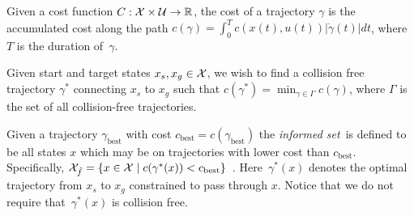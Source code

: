 \documentclass[letterpaper, 10 pt, conference]{ieeeconf}  %
\begin{document}
Given a cost function $C : \mathcal{X} \times \mathcal{U} \rightarrow \mathbb{R}$, the cost of a trajectory $ \gamma $ is the accumulated cost along the path
$c(\gamma) = \int_0^{T} c( x(t), u(t) ) |\dot{\gamma}(t)|dt$, 
where $T$ is the duration of~$\gamma$.

Given start and target states $x_s, x_g \in \mathcal{X}$, we wish to find a collision free trajectory $\gamma^*$ connecting $x_s$ to $x_g$ such that 
$c(\gamma^*) = \min_{\gamma \in \Gamma} c(\gamma)$, where $\Gamma$ is the set of all collision-free trajectories.

Given a trajectory $\gamma_{\text{best}}$ with cost $c_{\text{best}} = c(\gamma_{\text{best}})$ the \emph{informed set}~\Cinf is defined to be all states $x$  which may be on trajectories with lower cost than $c_{\text{best}}$.
Specifically,
$
\mathcal{X}_{\hat{f}} = \{ x \in \mathcal{X} \mid  
		c ( \gamma^*(x) ) < c_{\rm best} \} $~\cite{GSB14}.
Here~$ \gamma^*(x) $ denotes the optimal trajectory  from $ x_s $ to $ x_g $ constrained to pass through $ x $.
Notice that we do not require that~$ \gamma^*(x) $ is collision free.
\end{document}
